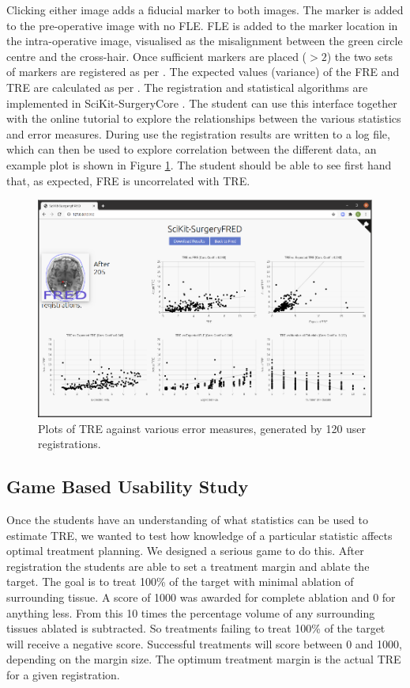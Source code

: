 Clicking either image adds a fiducial marker to both images. The marker is added to the pre-operative image with no \gls{FLE}. \gls{FLE} is added to the marker location in the intra-operative image, visualised as the misalignment between the green circle centre and the cross-hair. Once sufficient markers are placed ($>2$) the two sets of markers are registered as per \cite{Arun1987}. The expected values (variance) of the \gls{FRE} and \gls{TRE} are calculated 
as per \cite{Fitzpatrick1998}. The registration and statistical algorithms are implemented in SciKit-SurgeryCore \cite{matt_clarkson_2020_3965731}. The student can use this interface together with the
online tutorial 
to explore the relationships between the various statistics and error measures. During use the registration results are 
written to a log file, which can then be used to explore correlation between the different data, an example plot is shown in Figure \ref{fig:correlation}. 
The student should be able to see first hand that, as expected, \gls{FRE} is uncorrelated with \gls{TRE}.

\begin{figure}
	\begin{center}
	\includegraphics[width=0.9\linewidth]{images/default.eps}
		\caption{\label{fig:correlation}Plots of TRE against various error measures, generated by 
		120 user registrations.}
	\end{center}
\end{figure}

\subsection{Game Based Usability Study}
\label{sec:game_method}
Once the students have an understanding of what statistics can be used to estimate \gls{TRE}, we wanted to test 
how knowledge of a particular statistic affects optimal treatment planning. We designed a serious game to 
do this. After registration the students are able to set a treatment margin and ablate the target. The goal is 
to treat 100\% of the target with minimal ablation of surrounding tissue. A score of 1000 was awarded for complete ablation and 0 
for anything less. From this 10 times the percentage volume of any surrounding tissues ablated is subtracted. So 
treatments failing to treat 100\% of the target will receive a negative score. 
Successful treatments will score between 0 and 1000, depending on the margin size. The optimum treatment 
margin is the actual \gls{TRE} for a given registration.

